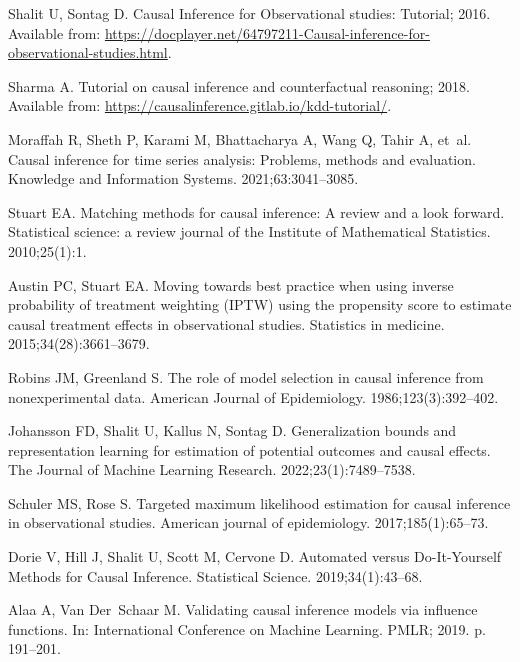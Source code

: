 \documentclass[10pt,letterpaper]{article}
\begin{document}
\begin{thebibliography}{100}
  Shalit U, Sontag D. Causal Inference for Observational studies: Tutorial; 2016.
  \newblock Available from: \url{https://docplayer.net/64797211-Causal-inference-for-observational-studies.html}.

  Sharma A. Tutorial on causal inference and counterfactual reasoning; 2018.
  \newblock Available from: \url{https://causalinference.gitlab.io/kdd-tutorial/}.

  Moraffah R, Sheth P, Karami M, Bhattacharya A, Wang Q, Tahir A, et~al.
  \newblock Causal inference for time series analysis: Problems, methods and evaluation.
  \newblock Knowledge and Information Systems. 2021;63:3041--3085.

  Stuart EA.
  \newblock Matching methods for causal inference: A review and a look forward.
  \newblock Statistical science: a review journal of the Institute of Mathematical Statistics. 2010;25(1):1.

  Austin PC, Stuart EA.
  \newblock Moving towards best practice when using inverse probability of treatment weighting (IPTW) using the propensity score to estimate causal treatment effects in observational studies.
  \newblock Statistics in medicine. 2015;34(28):3661--3679.

  Robins JM, Greenland S.
  \newblock The role of model selection in causal inference from nonexperimental data.
  \newblock American Journal of Epidemiology. 1986;123(3):392--402.

  Johansson FD, Shalit U, Kallus N, Sontag D.
  \newblock Generalization bounds and representation learning for estimation of potential outcomes and causal effects.
  \newblock The Journal of Machine Learning Research. 2022;23(1):7489--7538.

  Schuler MS, Rose S.
  \newblock Targeted maximum likelihood estimation for causal inference in observational studies.
  \newblock American journal of epidemiology. 2017;185(1):65--73.

  Dorie V, Hill J, Shalit U, Scott M, Cervone D.
  \newblock Automated versus Do-It-Yourself Methods for Causal Inference.
  \newblock Statistical Science. 2019;34(1):43--68.

  Alaa A, Van Der~Schaar M.
  \newblock Validating causal inference models via influence functions.
  \newblock In: International Conference on Machine Learning. PMLR; 2019. p. 191--201.


\end{thebibliography}
\end{document}
